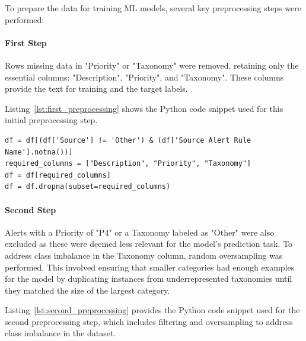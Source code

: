 To prepare the data for training ML models, several key preprocessing steps were performed:

\paragraph{First Step}
Rows missing data in "Priority" or "Taxonomy" were removed, retaining only the essential columns: "Description", "Priority", and "Taxonomy". 
These columns provide the text for training and the target labels.

Listing~\ref{lst:first_preprocessing} shows the Python code snippet used for this initial preprocessing step.

\vspace{0.2cm}
\noindent
\begin{minipage}{\linewidth}
\begin{verbatim}
df = df[(df['Source'] != 'Other') & (df['Source Alert Rule Name'].notna())]
required_columns = ["Description", "Priority", "Taxonomy"]
df = df[required_columns]
df = df.dropna(subset=required_columns)
\end{verbatim}
\label{lst:first_preprocessing}
\end{minipage}
\vspace{0.1cm}

\paragraph{Second Step}
Alerts with a Priority of "P4" or a Taxonomy labeled as "Other" were also excluded as these were deemed less relevant for the model's prediction task. 
To address class imbalance in the Taxonomy column, random oversampling was performed. 
This involved ensuring that smaller categories had enough examples for the model by duplicating instances from underrepresented taxonomies until they matched the size of the largest category.

Listing~\ref{lst:second_preprocessing} provides the Python code snippet used for the second preprocessing step, which includes filtering and oversampling to address class imbalance in the dataset. 

